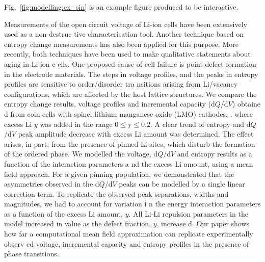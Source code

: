 {\color{green} Fig.~\ref{fig:modelling:ex_sin} is an example figure produced to be interactive.}    
                                 
                                                                                                    
Measurements of the open circuit voltage of Li-ion cells have been extensively used as a non-destruc
tive characterisation tool.                                                                         
Another technique based on entropy change measurements has also been applied for this purpose.      
More recently, both techniques have been used to make qualitative statements about aging in Li-ion c
ells.                                                                                               
One proposed cause of cell failure is point defect formation in the electrode materials.            
The steps in voltage profiles, and the peaks in entropy profiles are sensitive to order/disorder tra
nsitions arising from Li/vacancy configurations, which are affected by the host lattice structures. 
We compare the entropy change results, voltage profiles and incremental capacity (d$Q$/d$V$) obtaine
d from coin cells with spinel lithium manganese oxide (LMO) cathodes, ,     
where excess Li $y$ was added in the range $0 \leq $y$ \leq 0.2$.                                   
A clear trend of entropy and d$Q$/d$V$ peak amplitude decrease with excess Li amount was determined.
The effect arises, in part, from the presence of pinned Li sites, which disturb the formation of the
 ordered phase.                                                                                     
We modelled the voltage, d$Q$/d$V$ and entropy results as a function of the interaction parameters a
nd the excess Li amount, using a mean field approach.                                               
For a given pinning population, we demonstrated that the asymmetries observed in the d$Q$/d$V$ peaks
 can be modelled by a single linear correction term.                                                
To replicate the observed peak separations, widths and magnitudes, we had to account for variation i
n the energy interaction parameters as a function of the excess Li amount, $y$.                     
All Li-Li repulsion parameters in the model increased in value as the defect fraction, $y$, increase
d.                                                                                                  
Our paper shows how far a computational mean field approximation can replicate experimentally observ
ed voltage, incremental capacity and entropy profiles in the presence of phase transitions.